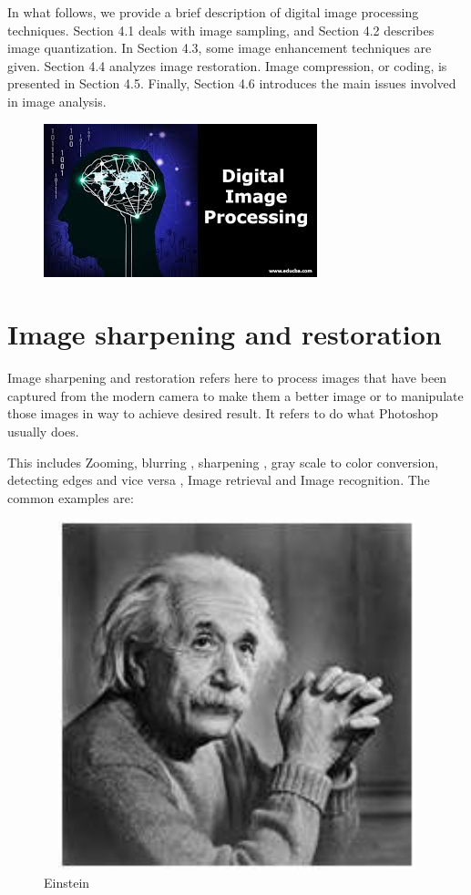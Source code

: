 \documentclass[a4paper]{article}
\begin{document}
In what follows, we provide a brief description of digital image processing techniques. Section 4.1 deals with image sampling, and Section 4.2 describes image quantization. In Section 4.3, some image enhancement techniques are given. Section 4.4 analyzes image restoration. Image compression, or coding, is presented in Section 4.5. Finally, Section 4.6 introduces the main issues involved in image analysis.
\begin{figure}[h]
\centering
\includegraphics{bb}
\end{figure}

 
 \cleardoublepage
  
  \tableofcontents
  \thispagestyle{empty}
  \cleardoublepage
  
  \setcounter{page}{1}  
  
  \section{Image sharpening and restoration
}
  Image sharpening and restoration refers here to process images that have been captured from the modern camera to make them a better image or to manipulate those images in way to achieve desired result. It refers to do what Photoshop usually does.

This includes Zooming, blurring , sharpening , gray scale to color conversion, detecting edges and vice versa , Image retrieval and Image recognition. The common examples are:
\begin{figure}[h]
\centering
\includegraphics[width=5in,height=4in]{ms}
\caption{Einstein}
\end{figure}
\end{document}
